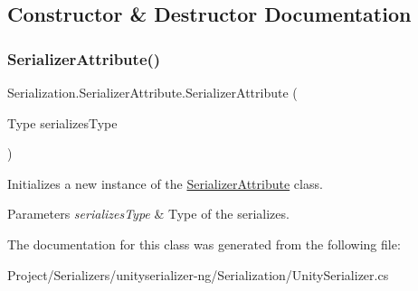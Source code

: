 \subsection{Constructor \& Destructor Documentation}
\mbox{\label{class_serialization_1_1_serializer_attribute_a475101d279677de97c551398f3f67530}} 
\subsubsection{\texorpdfstring{Serializer\+Attribute()}{SerializerAttribute()}}
{\footnotesize\ttfamily Serialization.\+Serializer\+Attribute.\+Serializer\+Attribute (\begin{DoxyParamCaption}\item[{Type}]{serializes\+Type }\end{DoxyParamCaption})\hspace{0.3cm}{\ttfamily [inline]}}



Initializes a new instance of the \hyperlink{class_serialization_1_1_serializer_attribute}{Serializer\+Attribute} class. 


\begin{DoxyParams}{Parameters}
{\em serializes\+Type} & Type of the serializes.\\
\hline
\end{DoxyParams}


The documentation for this class was generated from the following file\+:\begin{DoxyCompactItemize}
\item 
Project/\+Serializers/unityserializer-\/ng/\+Serialization/Unity\+Serializer.\+cs\end{DoxyCompactItemize}
